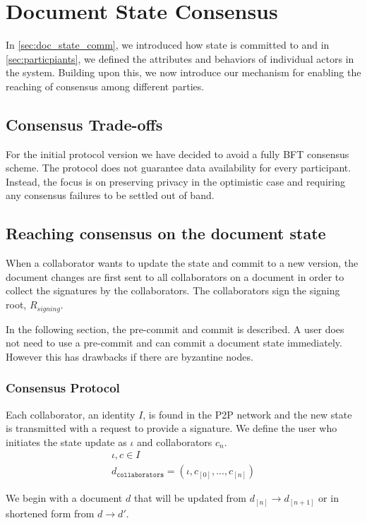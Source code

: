 \section{Document State Consensus}
\label{sec:consensus}
In \ref{sec:doc_state_comm}, we introduced how state is committed to and in \ref{sec:particpiants}, we defined the attributes and behaviors of individual actors in the system. Building upon this, we now introduce our mechanism for enabling the reaching of consensus among different parties.
\subsection{Consensus Trade-offs}
For the initial protocol version we have decided to avoid a fully BFT consensus scheme. The protocol does not guarantee data availability for every participant. Instead, the focus is on preserving privacy in the optimistic case and requiring any consensus failures to be settled out of band. 
\subsection{Reaching consensus on the document state}\label{sec:reach_consensus}
When a collaborator wants to update the state and commit to a new version, the document changes are first sent to all collaborators on a document in order to collect the signatures by the collaborators. The collaborators sign the signing root, $R_{signing}$.

In the following section, the pre-commit and commit is described. A user does not need to use a pre-commit and can commit a document state immediately. However this has drawbacks if there are byzantine nodes.

\subsubsection{Consensus Protocol}
Each collaborator, an identity $I$, is found in the P2P network and the new state is transmitted with a request to provide a signature. We define the user who initiates the state update as $\iota$ and collaborators $c_n$.
\begin{eqnarray}
\iota,c \in I\\
     d_{\mathtt{collaborators}} = (\iota, c_{[0]}, ..., c_{[n]})
\end{eqnarray}

We begin with a document $d$ that will be updated from $d_{[n]} \to d_{[n+1]}$ or in shortened form from $d \to d'$. 

